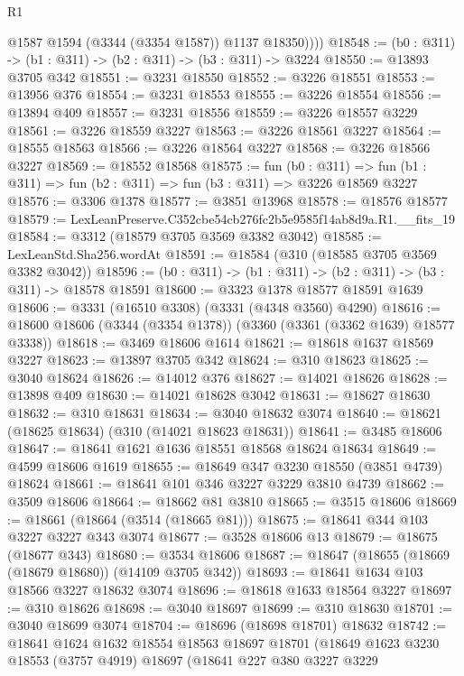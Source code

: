 \begin{lexlean}{R1}
\begin{coremodule}
            @1587
            @1594
            (@3344 (@3354 @1587))
            @1137
            @18350))))
@18548 := (b0 : @311) -> (b1 : @311) -> (b2 : @311) -> (b3 : @311) -> @3224
@18550 := @13893 @3705 @342
@18551 := @3231 @18550
@18552 := @3226 @18551
@18553 := @13956 @376
@18554 := @3231 @18553
@18555 := @3226 @18554
@18556 := @13894 @409
@18557 := @3231 @18556
@18559 := @3226 @18557 @3229
@18561 := @3226 @18559 @3227
@18563 := @3226 @18561 @3227
@18564 := @18555 @18563
@18566 := @3226 @18564 @3227
@18568 := @3226 @18566 @3227
@18569 := @18552 @18568
@18575 := fun (b0 : @311) =>
  fun (b1 : @311) => fun (b2 : @311) => fun (b3 : @311) => @3226 @18569 @3227
@18576 := @3306 @1378
@18577 := @3851 @13968
@18578 := @18576 @18577
@18579 := LexLeanPreserve.C352cbe54cb276fc2b5e9585f14ab8d9a.R1.__fits_19
@18584 := @3312 (@18579 @3705 @3569 @3382 @3042)
@18585 := LexLeanStd.Sha256.wordAt
@18591 := @18584 (@310 (@18585 @3705 @3569 @3382 @3042))
@18596 := (b0 : @311) -> (b1 : @311) -> (b2 : @311) -> (b3 : @311) -> @18578 @18591
@18600 := @3323 @1378 @18577 @18591 @1639
@18606 := @3331 (@16510 @3308) (@3331 (@4348 @3560) @4290)
@18616 := @18600 @18606 (@3344 (@3354 @1378)) (@3360 (@3361 (@3362 @1639) @18577 @3338))
@18618 := @3469 @18606 @1614
@18621 := @18618 @1637 @18569 @3227
@18623 := @13897 @3705 @342
@18624 := @310 @18623
@18625 := @3040 @18624
@18626 := @14012 @376
@18627 := @14021 @18626
@18628 := @13898 @409
@18630 := @14021 @18628 @3042
@18631 := @18627 @18630
@18632 := @310 @18631
@18634 := @3040 @18632 @3074
@18640 := @18621 (@18625 @18634) (@310 (@14021 @18623 @18631))
@18641 := @3485 @18606
@18647 := @18641 @1621 @1636 @18551 @18568 @18624 @18634
@18649 := @4599 @18606 @1619
@18655 := @18649 @347 @3230 @18550 (@3851 @4739) @18624
@18661 := @18641 @101 @346 @3227 @3229 @3810 @4739
@18662 := @3509 @18606
@18664 := @18662 @81 @3810
@18665 := @3515 @18606
@18669 := @18661 (@18664 (@3514 (@18665 @81)))
@18675 := @18641 @344 @103 @3227 @3227 @343 @3074
@18677 := @3528 @18606 @13
@18679 := @18675 (@18677 @343)
@18680 := @3534 @18606
@18687 := @18647 (@18655 (@18669 (@18679 @18680)) (@14109 @3705 @342))
@18693 := @18641 @1634 @103 @18566 @3227 @18632 @3074
@18696 := @18618 @1633 @18564 @3227
@18697 := @310 @18626
@18698 := @3040 @18697
@18699 := @310 @18630
@18701 := @3040 @18699 @3074
@18704 := @18696 (@18698 @18701) @18632
@18742 := @18641
    @1624
    @1632
    @18554
    @18563
    @18697
    @18701
    (@18649
      @1623
      @3230
      @18553
      (@3757 @4919)
      @18697
      (@18641
        @227
        @380
        @3227
        @3229

\end{coremodule}
\end{lexlean}
